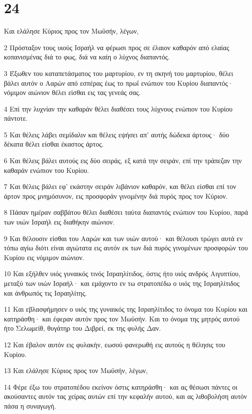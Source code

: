 \chapter{24}

\par Και ελάλησε Κύριος προς τον Μωϋσήν, λέγων,
\par 2 Πρόσταξον τους υιούς Ισραήλ να φέρωσι προς σε έλαιον καθαρόν από ελαίας κοπανισμένας διά το φως, διά να καίη ο λύχνος διαπαντός.
\par 3 Έξωθεν του καταπετάσματος του μαρτυρίου, εν τη σκηνή του μαρτυρίου, θέλει βάλει αυτόν ο Ααρών από εσπέρας έως το πρωΐ ενώπιον του Κυρίου διαπαντός· νόμιμον αιώνιον θέλει είσθαι εις τας γενεάς σας.
\par 4 Επί την λυχνίαν την καθαράν θέλει διαθέσει τους λύχνους ενώπιον του Κυρίου πάντοτε.
\par 5 Και θέλεις λάβει σεμίδαλιν και θέλεις εψήσει απ' αυτής δώδεκα άρτους· δύο δέκατα θέλει είσθαι έκαστος άρτος.
\par 6 Και θέλεις βάλει αυτούς εις δύο σειράς, εξ κατά την σειράν, επί την τράπεζαν την καθαράν ενώπιον του Κυρίου.
\par 7 Και θέλεις βάλει εφ' εκάστην σειράν λιβάνιον καθαρόν, και θέλει είσθαι επί τον άρτον προς μνημόσυνον, εις προσφοράν γινομένην διά πυρός προς τον Κύριον.
\par 8 Πάσαν ημέραν σαββάτου θέλει διαθέσει ταύτα διαπαντός ενώπιον του Κυρίου, παρά των υιών Ισραήλ εις διαθήκην αιώνιον.
\par 9 Και θέλουσιν είσθαι του Ααρών και των υιών αυτού· και θέλουσι τρώγει αυτά εν τόπω αγίω διότι είναι αγιώτατα εις αυτόν εκ των διά πυρός γινομένων προσφορών του Κυρίου εις νόμιμον αιώνιον.
\par 10 Και εξήλθεν υιός γυναικός τινός Ισραηλίτιδος, όστις ήτο υιός ανδρός Αιγυπτίου, μεταξύ των υιών Ισραήλ· και εμάχοντο εν τω στρατοπέδω ο υιός της Ισραηλίτιδος και άνθρωπός τις Ισραηλίτης.
\par 11 Και εβλασφήμησεν ο υιός της γυναικός της Ισραηλίτιδος το όνομα του Κυρίου και κατηράσθη· και έφεραν αυτόν προς τον Μωϋσήν. Και το όνομα της μητρός αυτού ήτο Σελωμείθ, θυγάτηρ του Διβρεί, εκ της φυλής Δαν.
\par 12 Και έβαλον αυτόν εις φυλακήν, εωσού φανερωθή εις αυτούς η θέλησις του Κυρίου.
\par 13 Και ελάλησε Κύριος προς τον Μωϋσήν, λέγων,
\par 14 Φέρε έξω του στρατοπέδου εκείνον όστις κατηράσθη· και ας θέσωσι πάντες οι ακούσαντες αυτόν τας χείρας αυτών επί την κεφαλήν αυτού, και ας λιθοβολήση αυτόν πάσα η συναγωγή.
